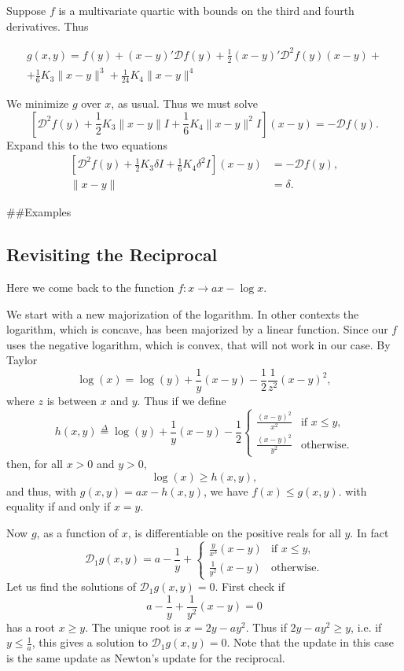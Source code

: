 \documentclass[
  12pt,
]{book}
\begin{document}
Suppose \(f\) is a multivariate quartic with bounds on the third and fourth derivatives. Thus

\begin{multline}
g(x,y)=f(y)+(x-y)'\mathcal{D}f(y)+\frac12(x-y)'\mathcal{D}^2f(y)(x-y)+\\+\frac16K_3\|x-y\|^3+\frac{1}{24}K_4\|x-y\|^4
\end{multline}

We minimize \(g\) over \(x\), as usual. Thus we must solve
\[
\left[\mathcal{D}^2f(y)+\frac12K_3\|x-y\|I+\frac16K_4\|x-y\|^2I\right](x-y)=-\mathcal{D}f(y).
\]
Expand this to the two equations
\begin{align*}
\left[\mathcal{D}^2f(y)+\frac12K_3\delta I+\frac16K_4\delta^2I\right](x-y)&=-\mathcal{D}f(y),\\
\|x-y\|&=\delta.
\end{align*}

\#\#Examples

\hypertarget{revisiting-the-reciprocal}{%
\subsection{Revisiting the Reciprocal}\label{revisiting-the-reciprocal}}

Here we come back to the function \(f:x\rightarrow ax-\log x.\)

We start with a new majorization of the logarithm. In other contexts the logarithm, which is concave, has been majorized by a linear function. Since our \(f\) uses the negative logarithm, which is convex, that will not work in our case. By Taylor
\[
\log(x) = \log (y) + \frac{1}{y}(x-y)-\frac12\frac{1}{z^2}(x-y)^2,
\]
where \(z\) is between \(x\) and \(y\). Thus if we define
\[
h(x,y)\mathop{=}\limits^{\Delta}\log (y) + \frac{1}{y}(x-y)-\frac12\begin{cases}
\frac{(x-y)^2}{x^2}&\text{if }x\leq y,\\
\frac{(x-y)^2}{y^2}&\text{otherwise}.
\end{cases}
\]
then, for all \(x>0\) and \(y>0\),
\[
\log(x)\geq h(x,y),
\]
and thus, with \(g(x,y)=ax-h(x,y)\), we have \(f(x)\leq g(x,y).\)
with equality if and only if \(x=y\).

Now \(g\), as a function of \(x\), is differentiable on the positive reals for all \(y\). In fact
\[
\mathcal{D}_1g(x,y)=
a-\frac{1}{y}+\begin{cases}
\frac{y}{x^3}(x-y)&\text{if }x\leq y,\\
\frac{1}{y^2}(x-y)&\text{otherwise}.
\end{cases}
\]
Let us find the solutions of \(\mathcal{D}_1g(x,y)=0\). First check if
\[
a-\frac{1}{y}+\frac{1}{y^2}(x-y)=0
\]
has a root \(x\geq y\). The unique root
is \(x=2y-ay^2\). Thus if \(2y-ay^2\geq y\), i.e.
if \(y\leq\frac{1}{a}\), this gives
a solution to \(\mathcal{D}_1g(x,y)=0\). Note that the update in this case is the same
update as Newton's update for the reciprocal.
\end{document}

